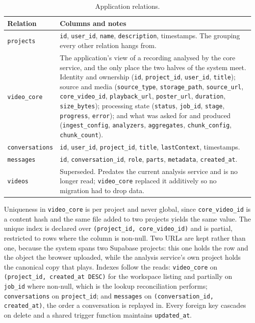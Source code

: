 \documentclass[11pt,a4paper]{article}
\begin{document}

\begin{table}[htbp]
\centering
\small
\begin{tabularx}{\textwidth}{@{}L{2.4cm}X@{}}
\toprule
\textbf{Relation} & \textbf{Columns and notes} \\
\midrule
\texttt{projects} & \texttt{id}, \texttt{user\_id}, \texttt{name},
\texttt{description}, timestamps. The grouping every other relation hangs from. \\
\texttt{video\_core} & The application's view of a recording analysed by the core
service, and the only place the two halves of the system meet. Identity and
ownership (\texttt{id}, \texttt{project\_id}, \texttt{user\_id},
\texttt{title}); source and media (\texttt{source\_type},
\texttt{storage\_path}, \texttt{source\_url}, \texttt{core\_video\_id},
\texttt{playback\_url}, \texttt{poster\_url}, \texttt{duration},
\texttt{size\_bytes}); processing state (\texttt{status}, \texttt{job\_id},
\texttt{stage}, \texttt{progress}, \texttt{error}); and what was asked for and
produced (\texttt{ingest\_config}, \texttt{analyzers}, \texttt{aggregates},
\texttt{chunk\_config}, \texttt{chunk\_count}). \\
\texttt{conversations} & \texttt{id}, \texttt{user\_id}, \texttt{project\_id},
\texttt{title}, \texttt{lastContext}, timestamps. \\
\texttt{messages} & \texttt{id}, \texttt{conversation\_id}, \texttt{role},
\texttt{parts}, \texttt{metadata}, \texttt{created\_at}. \\
\texttt{videos} & Superseded. Predates the current analysis service and is no
longer read; \texttt{video\_core} replaced it additively so no migration had to
drop data. \\
\bottomrule
\end{tabularx}
\caption{Application relations.}
\end{table}

Uniqueness in \texttt{video\_core} is per project and never global, since
\texttt{core\_video\_id} is a content hash and the same file added to two
projects yields the same value. The unique index is declared over
\texttt{(project\_id, core\_video\_id)} and is partial, restricted to rows where
the column is non-null. Two URLs are kept rather than one, because the system
spans two Supabase projects: this one holds the row and the object the browser
uploaded, while the analysis service's own project holds the canonical copy that
plays. Indexes follow the reads: \texttt{video\_core} on
\texttt{(project\_id, created\_at DESC)} for the workspace listing and partially
on \texttt{job\_id} where non-null, which is the lookup reconciliation performs;
\texttt{conversations} on \texttt{project\_id}; and \texttt{messages} on
\texttt{(conversation\_id, created\_at)}, the order a conversation is replayed
in. Every foreign key cascades on delete and a shared trigger function maintains
\texttt{updated\_at}.
\end{document}
